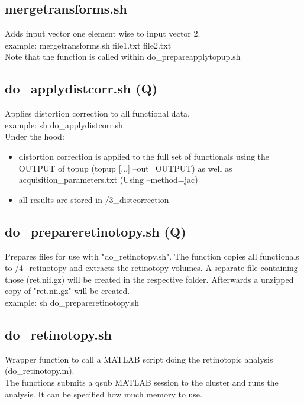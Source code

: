 \documentclass[12pt,a4paper]{scrartcl}
\begin{document}
\subsection{mergetransforms.sh}
Adds input vector one element wise to input vector 2.\\

\noindent example: mergetransforms.sh file1.txt file2.txt\\

\noindent Note that the function is called within do\_prepareapplytopup.sh

\subsection{do\_applydistcorr.sh (Q)}
Applies distortion correction to all functional data.\\

\noindent example: sh do\_applydistcorr.sh\\

\noindent Under the hood:
\begin{itemize}
\item distortion correction is applied to the full set of functionals using the OUTPUT of topup (topup [$\ldots$] --out=OUTPUT) as well as acquisition\_parameters.txt (Using --method=jac)
\item all results are stored in /3\_distcorrection
\end{itemize}


\subsection{do\_prepareretinotopy.sh (Q)}
Prepares files for use with "do\_retinotopy.sh". The function copies all functionals to /4\_retinotopy and extracts the retinotopy volumes. A separate file containing those (ret.nii.gz) will be created in the respective folder. Afterwards a unzipped copy of "ret.nii.gz" will be created.\\

example: sh do\_prepareretinotopy.sh

\subsection{do\_retinotopy.sh}
Wrapper function to call a MATLAB script doing the retinotopic analysis (do\_retinotopy.m).\\

\noindent The functions submits a qsub MATLAB session to the cluster and runs the analysis. It can be specified how much memory to use.\\
\end{document}
